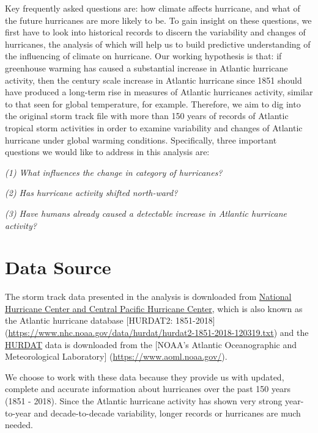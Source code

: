 \documentclass[]{book}
\begin{document}
Key frequently asked questions are: how climate affects hurricane, and what of the future hurricanes are more likely to be. To gain insight on these questions, we first have to look into historical records to discern the variability and changes of hurricanes, the analysis of which will help us to build predictive understanding of the influencing of climate on hurricane. Our working hypothesis is that: if greenhouse warming has caused a substantial increase in Atlantic hurricane activity, then the century scale increase in Atlantic hurricane since 1851 should have produced a long-term rise in measures of Atlantic hurricanes activity, similar to that seen for global temperature, for example. Therefore, we aim to dig into the original storm track file with more than 150 years of records of Atlantic tropical storm activities in order to examine variability and changes of Atlantic hurricane under global warming conditions. Specifically, three important questions we would like to address in this analysis are:

\emph{(1) What influences the change in category of hurricanes?}

\emph{(2) Has hurricane activity shifted north-ward?}

\emph{(3) Have humans already caused a detectable increase in Atlantic hurricane activity?}

\hypertarget{datasource}{%
\chapter{Data Source}\label{datasource}}

The storm track data presented in the analysis is downloaded from \href{https://www.nhc.noaa.gov/data/\#hurdat}{National Hurricane Center and Central Pacific Hurricane Center}, which is also known as the Atlantic hurricane database {[}HURDAT2: 1851-2018{]} (\url{https://www.nhc.noaa.gov/data/hurdat/hurdat2-1851-2018-120319.txt}) and the \href{https://www.aoml.noaa.gov/hrd/hurdat/comparison_table.html.}{HURDAT} data is downloaded from the {[}NOAA's Atlantic Oceanographic and Meteorological Laboratory{]} (\url{https://www.aoml.noaa.gov/}).

We choose to work with these data because they provide us with updated, complete and accurate information about hurricanes over the past 150 years (1851 - 2018). Since the Atlantic hurricane activity has shown very strong year-to-year and decade-to-decade variability, longer records or hurricanes are much needed.
\end{document}
